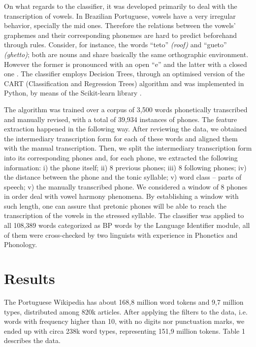 On what regards to the classifier, it was developed primarily to deal with the transcription of vowels. In Brazilian
Portuguese, vowels have a very irregular behavior, specially the mid ones. Therefore the relations between the vowels' 
graphemes and their corresponding phonemes are hard to predict beforehand through rules. Consider, for instance, the words 
``teto'' \emph{(roof)} and ``gueto'' \emph{(ghetto)}; both are nouns and share basically the same orthographic environment.
However the former is pronounced with an open ``e'' \textipa{["tE.tU]} and the latter with a closed one \textipa{["ge.tU]}.
The classifier employs Decision Trees, through an optimised version of the CART (Classification and Regression Trees)
algorithm and was implemented in Python, by means of the Scikit-learn library \cite{Scikit2011}. 

The algorithm was trained over a corpus of 3,500 words phonetically transcribed and manually revised, with a total
of 39,934 instances of phones. The feature extraction happened in the following way. After reviewing the data, we obtained the intermediary 
transcription form for each of these words and aligned them with the manual transcription. Then, we split
the intermediary transcription form into its corresponding phones and, for each phone, we extracted the following 
information: i) the phone itself; ii) 8 previous phones; iii) 8 following phones; iv) the distance between 
the phone and the tonic syllable; v) word class -- parts of speech; v) the manually transcribed phone. We considered
a window of 8 phones in order deal with vowel harmony phenomena. By establishing a window with such length, one 
can assure that pretonic phones will be able to reach the transcription of the vowels in the stressed syllable.
The classifier was applied to all 108,389 words categorized as BP words by the Language Identifier module,
all of them were cross-checked by two linguists with experience in Phonetics and Phonology.

\section{Results}

The Portuguese Wikipedia has about 168,8 million word tokens and 9,7 million types, distributed among 820k articles.
After applying the filters to the data, i.e. words with frequency higher than 10, with no digits nor punctuation marks,
we ended up with circa 238k word types, representing 151,9 million tokens. Table 1 describes the data.


